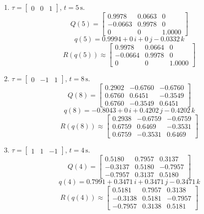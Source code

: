 \documentclass[11pt]{article}
\begin{document}
\begin{enumerate}
\item[(a)]
$\tau=\begin{bmatrix}0&0&1\end{bmatrix}$, \quad $t=5\,\mathrm{s}$.
\[
Q(5)=
\begin{bmatrix}
0.9978 & 0.0663 & 0\\
-0.0663 & 0.9978 & 0\\
0 & 0 & 1.0000
\end{bmatrix}
\]
\[
q(5)=0.9994 + 0\,i + 0\,j - 0.0332\,k
\]
\[
R\!\left(q(5)\right)\approx
\begin{bmatrix}
0.9978 & 0.0664 & 0\\
-0.0664 & 0.9978 & 0\\
0 & 0 & 1.0000
\end{bmatrix}
\]

\item[(b)]
$\tau=\begin{bmatrix}0&-1&1\end{bmatrix}$, \quad $t=8\,\mathrm{s}$.
\[
Q(8)=
\begin{bmatrix}
0.2902 & -0.6760 & -0.6760\\
0.6760 & 0.6451 & -0.3549\\
0.6760 & -0.3549 & 0.6451
\end{bmatrix}
\]
\[
q(8)= -0.8043 + 0\,i + 0.4202\,j - 0.4202\,k
\]
\[
R\!\left(q(8)\right)\approx
\begin{bmatrix}
0.2938 & -0.6759 & -0.6759\\
0.6759 & 0.6469 & -0.3531\\
0.6759 & -0.3531 & 0.6469
\end{bmatrix}
\]

\item[(c)]
$\tau=\begin{bmatrix}1&1&-1\end{bmatrix}$, \quad $t=4\,\mathrm{s}$.
\[
Q(4)=
\begin{bmatrix}
0.5180 & 0.7957 & 0.3137\\
-0.3137 & 0.5180 & -0.7957\\
-0.7957 & 0.3137 & 0.5180
\end{bmatrix}
\]
\[
q(4)=0.7991 + 0.3471\,i + 0.3471\,j - 0.3471\,k
\]
\[
R\!\left(q(4)\right)\approx
\begin{bmatrix}
0.5181 & 0.7957 & 0.3138\\
-0.3138 & 0.5181 & -0.7957\\
-0.7957 & 0.3138 & 0.5181
\end{bmatrix}
\]
\end{enumerate}
\end{document}

